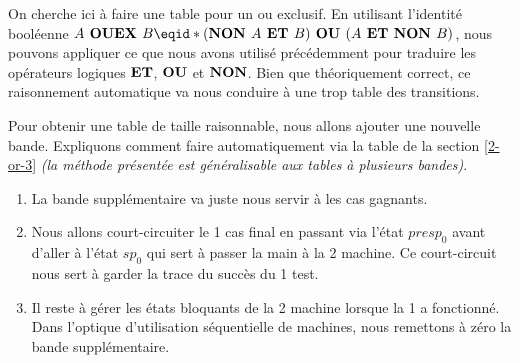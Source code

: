 On cherche ici à faire une table pour un ou exclusif.
En utilisant l'identité booléenne $A \boolope{ OUEX } B \eqid* (\boolope{NON } A \boolope{ ET } B) \boolope{ OU } (A \boolope{ ET NON } B)$, nous pouvons appliquer ce que nous avons utilisé précédemment pour traduire les opérateurs logiques $\text{\bfseries ET}$, $\text{\bfseries OU}$ et $\text{\bfseries NON}$.
Bien que théoriquement correct, ce raisonnement automatique va nous conduire à une trop  table des transitions.


\medskip


Pour obtenir une table de taille raisonnable, nous allons ajouter une nouvelle bande.
Expliquons comment faire automatiquement via la table  de la section \ref{2-or-3} \emph{(la méthode présentée est généralisable aux tables à plusieurs bandes)}.
\begin{enumerate}
	\item La bande supplémentaire va juste nous servir à  les cas gagnants.

	\item Nous allons court-circuiter le 1\ier{} cas final en passant via l'état $presp_0$ avant d'aller à l'état $sp_0$ qui sert à passer la main à la 2\ieme{} machine.
	      Ce court-circuit nous sert à garder la trace du succès du 1\ier{} test.

	\item Il reste à gérer les états bloquants de la 2\ieme{} machine lorsque la 1\iere{} a fonctionné.
	      Dans l'optique d'utilisation séquentielle de machines, nous remettons à zéro la bande supplémentaire.
\end{enumerate}


